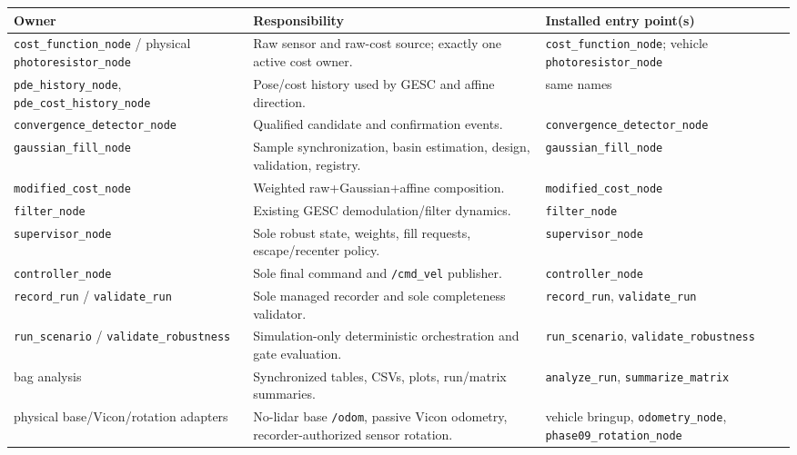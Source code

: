 \documentclass[
  10pt,
  letterpaper,
]{article}
\newcounter{none} %
\begin{document}
{\def\LTcaptype{none} %
\begin{longtable}[]{@{}
  >{\raggedright\arraybackslash}p{}
  >{\raggedright\arraybackslash}p{}
  >{\raggedright\arraybackslash}p{}@{}}
\toprule\noalign{}
\begin{minipage}[b]{\linewidth}\raggedright
Owner
\end{minipage} & \begin{minipage}[b]{\linewidth}\raggedright
Responsibility
\end{minipage} & \begin{minipage}[b]{\linewidth}\raggedright
Installed entry point(s)
\end{minipage} \\
\midrule\noalign{}
\endhead
\bottomrule\noalign{}
\endlastfoot
\nolinkurl{cost\_function\_node} / physical \nolinkurl{photoresistor\_node} & Raw sensor and raw-cost source; exactly one active cost owner. & \nolinkurl{cost\_function\_node}; vehicle \nolinkurl{photoresistor\_node} \\
\nolinkurl{pde\_history\_node}, \nolinkurl{pde\_cost\_history\_node} & Pose/cost history used by GESC and affine direction. & same names \\
\nolinkurl{convergence\_detector\_node} & Qualified candidate and confirmation events. & \nolinkurl{convergence\_detector\_node} \\
\nolinkurl{gaussian\_fill\_node} & Sample synchronization, basin estimation, design, validation, registry. & \nolinkurl{gaussian\_fill\_node} \\
\nolinkurl{modified\_cost\_node} & Weighted raw+Gaussian+affine composition. & \nolinkurl{modified\_cost\_node} \\
\nolinkurl{filter\_node} & Existing GESC demodulation/filter dynamics. & \nolinkurl{filter\_node} \\
\nolinkurl{supervisor\_node} & Sole robust state, weights, fill requests, escape/recenter policy. & \nolinkurl{supervisor\_node} \\
\nolinkurl{controller\_node} & Sole final command and \nolinkurl{/cmd\_vel} publisher. & \nolinkurl{controller\_node} \\
\nolinkurl{record\_run} / \nolinkurl{validate\_run} & Sole managed recorder and sole completeness validator. & \nolinkurl{record\_run}, \nolinkurl{validate\_run} \\
\nolinkurl{run\_scenario} / \nolinkurl{validate\_robustness} & Simulation-only deterministic orchestration and gate evaluation. & \nolinkurl{run\_scenario}, \nolinkurl{validate\_robustness} \\
bag analysis & Synchronized tables, CSVs, plots, run/matrix summaries. & \nolinkurl{analyze\_run}, \nolinkurl{summarize\_matrix} \\
physical base/Vicon/rotation adapters & No-lidar base \nolinkurl{/odom}, passive Vicon odometry, recorder-authorized sensor rotation. & vehicle bringup, \nolinkurl{odometry\_node}, \nolinkurl{phase09\_rotation\_node} \\
\end{longtable}
}
\end{document}
